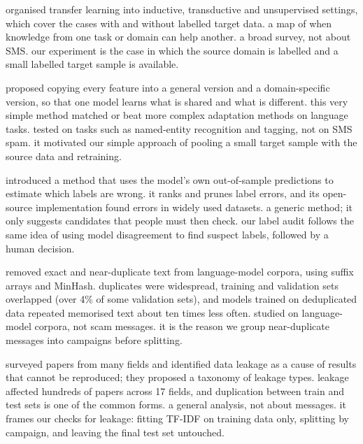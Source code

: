   organised transfer learning into inductive, transductive and unsupervised settings, which cover the cases with and without labelled target data.  a map of when knowledge from one task or domain can help another.  a broad survey, not about SMS.  our experiment is the case in which the source domain is labelled and a small labelled target sample is available.

  proposed copying every feature into a general version and a domain-specific version, so that one model learns what is shared and what is different.  this very simple method matched or beat more complex adaptation methods on language tasks.  tested on tasks such as named-entity recognition and tagging, not on SMS spam.  it motivated our simple approach of pooling a small target sample with the source data and retraining.

  introduced a method that uses the model's own out-of-sample predictions to estimate which labels are wrong.  it ranks and prunes label errors, and its open-source implementation found errors in widely used datasets.  a generic method; it only suggests candidates that people must then check.  our label audit follows the same idea of using model disagreement to find suspect labels, followed by a human decision.

  removed exact and near-duplicate text from language-model corpora, using suffix arrays and MinHash.  duplicates were widespread, training and validation sets overlapped (over 4\% of some validation sets), and models trained on deduplicated data repeated memorised text about ten times less often.  studied on language-model corpora, not scam messages.  it is the reason we group near-duplicate messages into campaigns before splitting.

  surveyed papers from many fields and identified data leakage as a cause of results that cannot be reproduced; they proposed a taxonomy of leakage types.  leakage affected hundreds of papers across 17 fields, and duplication between train and test sets is one of the common forms.  a general analysis, not about messages.  it frames our checks for leakage: fitting TF-IDF on training data only, splitting by campaign, and leaving the final test set untouched.

